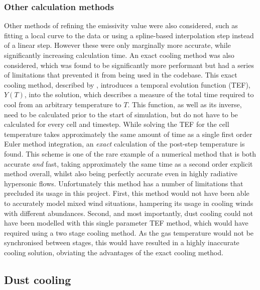 \subsubsection{Other calculation methods}
\label{sec:othercalc}

Other methods of refining the emissivity value were also considered, such as fitting a local curve to the data or using a spline-based interpolation step instead of a linear step.
However these were only marginally more accurate, while significantly increasing calculation time.
An exact cooling method was also considered, which was found to be significantly more performant but had a series of limitations that prevented it from being used in the codebase.
This exact cooling method, described by \textcite{townsendExactIntegrationScheme2009}, introduces a temporal evolution function (TEF), $Y(T)$, into the solution, which describes a measure of the total time required to cool from an arbitrary temperature to $T$.
This function, as well as its inverse, need to be calculated prior to the start of simulation, but do not have to be calculated for every cell and timestep.
While solving the TEF for the cell temperature takes approximately the same amount of time as a single first order Euler method integration, an \emph{exact} calculation of the post-step temperature is found.
This scheme is one of the rare example of a numerical method that is both accurate \emph{and} fast, taking approximately the same time as a second order explicit method overall, whilst also being perfectly accurate even in highly radiative hypersonic flows.
Unfortunately this method has a number of limitations that precluded its usage in this project.
First, this method would not have been able to accurately model mixed wind situations, hampering its usage in cooling winds with different abundances.
Second, and most importantly, dust cooling could not have been modelled with this single parameter TEF method, which would have required using a two stage cooling method.
As the gas temperature would not be synchronised between stages, this would have resulted in a highly inaccurate cooling solution, obviating the advantages of the exact cooling method.

\subsection{Dust cooling}
\label{sec:dustcoolingmodel}

